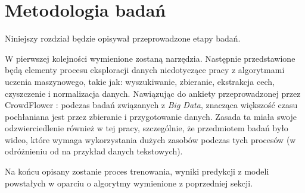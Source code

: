 
\chapter{Metodologia badań}
Niniejszy rozdział będzie opisywał przeprowadzone etapy badań. 

W pierwszej kolejności wymienione zostaną narzędzia. Następnie przedstawione będą elementy procesu eksploracji danych niedotyczące pracy z algorytmami uczenia maszynowego, takie jak: wyszukiwanie, zbieranie, ekstrakcja cech, czyszczenie i normalizacja danych. Nawiązując do ankiety przeprowadzonej przez CrowdFlower \cite{ds_report}: podczas badań związanych z {\em Big Data}, znacząca większość czasu pochłaniana jest przez zbieranie i przygotowanie danych. Zasada ta miała swoje odzwierciedlenie również w tej pracy, szczególnie, że przedmiotem badań było wideo, które wymaga wykorzystania dużych zasobów podczas tych procesów (w odróżnieniu od na przykład danych tekstowych). 

Na końcu opisany zostanie proces trenowania, wyniki predykcji z modeli powstałych w oparciu o algorytmy wymienione z poprzedniej sekcji.
\label{cha:pierwszyDokument}

